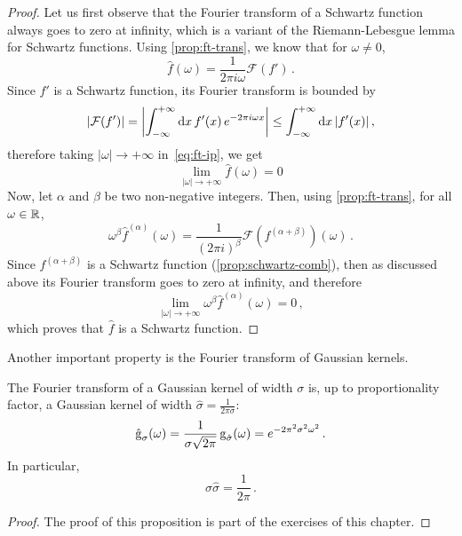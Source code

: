 \begin{proof}
  Let us first observe that the Fourier transform of a Schwartz function always goes to
  zero at infinity, which is a variant of the Riemann-Lebesgue lemma for Schwartz
  functions. Using \cref{prop:ft-trans}, we know that for $\omega\neq 0$,
  \begin{equation}
    \hat{f}(\omega)=\frac{1}{2\pi i\omega}\mathcal{F}(f')\,.\label{eq:ft-ip}
  \end{equation}
  Since $f'$ is a Schwartz function, its Fourier transform is bounded by
  \begin{equation}
    |\mathcal{F}(f')|=\left|\int_{-\infty}^{+\infty}\mathrm{d}{x}\,f'(x)\,e^{-2\pi i \omega x}\right|\leq
    \int_{-\infty}^{+\infty}\mathrm{d}{x}\,|f'(x)|\,,
  \end{equation}
  therefore taking $|\omega|\to+\infty$ in~\cref{eq:ft-ip}, we get
  \begin{equation}
    \lim_{|\omega|\to+\infty}\hat{f}(\omega)=0
  \end{equation}
  Now, let $\alpha$ and $\beta$ be two non-negative integers. Then, using
  \cref{prop:ft-trans}, for all $\omega\in\mathbb{R}$,
  \begin{equation}
    \omega^\beta\hat{f}^{(\alpha)}(\omega)=\frac{1}{(2\pi i)^{\beta}}\mathcal{F}(f^{(\alpha+\beta)})(\omega)\,.
  \end{equation}
  Since $f^{(\alpha+\beta)}$ is a Schwartz function (\cref{prop:schwartz-comb}), then as
  discussed above its Fourier transform goes to zero at infinity, and therefore
  \begin{equation}
    \lim_{|\omega|\to+\infty}\omega^\beta\hat{f}^{(\alpha)}(\omega)=0\,,
  \end{equation}
  which proves that $\hat{f}$ is a Schwartz function.
\end{proof}
Another important property is the Fourier transform of Gaussian kernels.
\begin{theorem}
  The Fourier transform of a Gaussian kernel of width $\sigma$ is, up to proportionality
  factor, a Gaussian kernel of width $\hat{\sigma}=\frac{1}{2\pi\sigma}$:
  \begin{equation}
    \hat{\operatorname{g}}_{\sigma}(\omega)=
    \frac{1}{\sigma\sqrt{2\pi}}\operatorname{g}_{\hat{\sigma}}(\omega)
    =e^{-2\pi^2\sigma^2\omega^2}\,.
  \end{equation}
  In particular,
  \begin{equation}
    \sigma\hat{\sigma}=\frac{1}{2\pi}\,.\label{eq:gauss-uncertainty}
  \end{equation}
\end{theorem}
\begin{proof}
  The proof of this proposition is part of the exercises of this chapter.
\end{proof}
